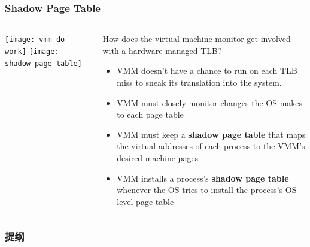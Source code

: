 \begin{frame}
	\frametitle{Shadow Page Table}
	
	
	
	\begin{columns}
		
		\begin{column}{.4\textwidth}
			\centering
			\texttt{[image: vmm-do-work]}
			\texttt{[image: shadow-page-table]}
		\end{column}
		
		\begin{column}{.6\textwidth}
			
			How does the virtual machine monitor get involved with a
			hardware-managed TLB?	
			
			\begin{itemize}
				\item VMM doesn't have a chance to run on each TLB miss to sneak its translation into the system. 
				\item VMM must closely monitor changes	the OS makes to each page table
				\item VMM must keep a \textbf{shadow page table} that maps the virtual addresses of each process to the VMM's desired machine pages
				\item VMM installs a process's \textbf{shadow page table }whenever the OS tries to install the process's	OS-level page table
				
			\end{itemize} 
			
			
			
		\end{column}
		
		
	\end{columns}
	
	
\end{frame}

\begin{frame}
\frametitle{提纲} %
\tableofcontents %
\end{frame}
